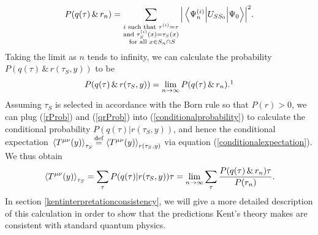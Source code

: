 $$P(q(\tau) \, \&\,  r_n) =\sum_{\substack{i \text{ such that } \tau^{(i)}=\tau \\ \text{and }\tau_S^{(i)}(x)=\tau_S(x)\\ \text{ for all }x\in S_n\cap S }}\abs{\mel{\Psi_n^{(i)}}{U_{SS_0}}{\Psi_0}}^2.$$
Taking the limit as $n$ tends to infinity, we can calculate the probability $P(q(\tau) \, \&\,  r(\tau_S,y))$ to be
\begin{equation}\label{qrProb}
P(q(\tau) \, \&\,  r(\tau_S,y))=\lim_{n\rightarrow\infty}P(q(\tau) \, \&\,  r_n).\protect\footnotemark
\end{equation}
Assuming $\tau_S$ is selected in accordance with the Born rule so that $P(r)>0$, we can plug (\ref{rProb}) and (\ref{qrProb}) into (\ref{conditionalprobability}) to calculate the conditional probability $P(q(\tau) | r(\tau_S,y))$,  and hence the conditional expectation  $\ev*{T^{\mu\nu}(y)}_{\tau_S}\myeq \ev*{T^{\mu\nu}(y)}_{r(\tau_S,y)}$ via equation (\ref{conditionalexpectation}). We thus obtain
\begin{equation}\label{beable1}
  \ev*{T^{\mu\nu}(y)}_{\tau_S}=\sum_\tau P(q(\tau) | r(\tau_S,y))\tau=\lim_{n\rightarrow\infty}\sum_\tau\frac{P(q(\tau) \, \& \, r_n)\tau}{P(r_n)}.
  \end{equation} 
In section \ref{kentinterpretationconsistency}, we will give a more detailed description of this calculation in order to show that the predictions Kent's theory makes are consistent with standard quantum physics.
 
 
